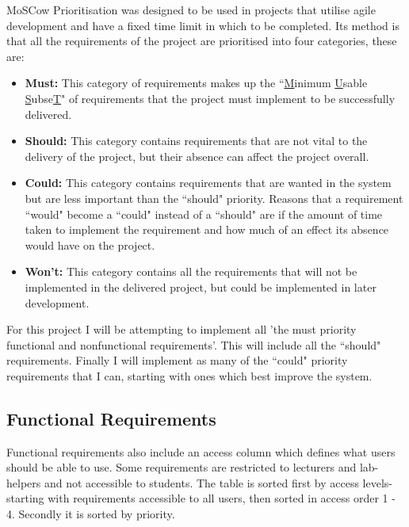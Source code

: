 \documentclass[11pt]{report}
\begin{document}
MoSCow Prioritisation \cite{_moscow_2015} was designed to be used in projects that utilise agile development and have a fixed time limit in which to be completed. Its method is that all the requirements of the project are prioritised into four categories, these are:

\begin{itemize}

\item \textbf{Must:} This category of requirements makes up the ``\underline{M}inimum \underline{U}sable \underline{S}ubse\underline{T}" of requirements that the project must implement to be successfully delivered.

\item \textbf{Should:} This category contains requirements that are not vital to the delivery of the project, but their absence can affect the project overall. 

\item \textbf{Could:} This category contains requirements that are wanted in the system but are less important than the ``should" priority. Reasons that a requirement ``would" become a ``could" instead of a ``should" are if the amount of time taken to implement the requirement and how much of an effect its absence would have on the project.   

\item \textbf{Won't:} This category contains all the requirements that will not be implemented in the delivered project, but could be implemented in later development.
\end{itemize}

\noindent For this project I will be attempting to implement all 'the must priority functional and nonfunctional requirements'. This will include all the ``should" requirements. Finally I will implement as many of the ``could" priority requirements that I can, starting with ones which best improve the system.


\def\arraystretch{1.2}
\subsection{Functional Requirements} \label{sec:func}

Functional requirements also include an access column which defines what users should be able to use. Some requirements are restricted to lecturers and lab-helpers and not accessible to students. The table is sorted first by access levels-starting with requirements accessible to all users, then sorted in access order 1 - 4. Secondly it is sorted by priority.
\end{document}

